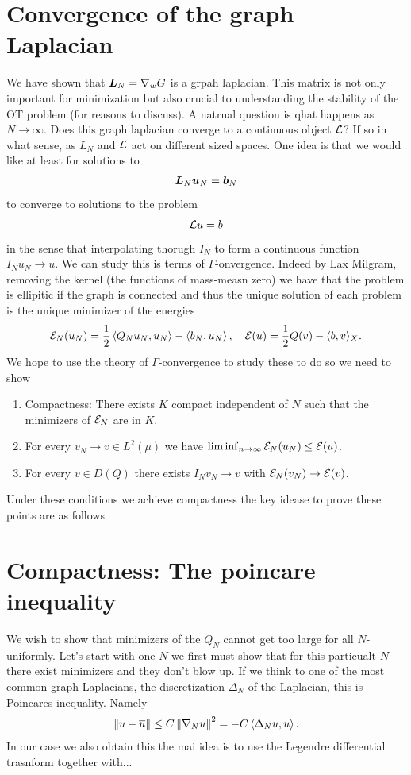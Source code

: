 \documentclass[
    a4paper,
    DIV=13,
    abstract=true,
    numbers=noenddot
]{scrartcl}
\begin{document}
\section{Convergence of the graph Laplacian}
We have shown that ${\bm{L}}_N=\nabla_wG$ is a grpah laplacian. This matrix is not only important for minimization but also crucial to understanding the stability of the OT problem (for reasons to discuss). A natrual question is qhat happens as $N \to \infty$. Does this graph laplacian converge to a continuous object $\mathcal{L}$? If so in what sense, as $L_N$ and $\mathcal{L}$ act on different sized spaces. One idea is that we would like at least for solutions to 
\begin{align*}
    {\bm{L}}_N {\bm{u}}_N= {\bm{b}}_N
\end{align*}
to converge to solutions to the problem
\begin{align*}
    \mathcal{L} u=b
\end{align*}
in the sense that interpolating thorugh $I_N$ to form a continuous function $I_N u_N \to u$. We can study this is terms of $\Gamma$-onvergence. Indeed by Lax Milgram, removing the kernel (the functions of mass-measn zero) we have that the problem is ellipitic if the graph is connected and thus the unique solution of each problem is the unique minimizer of the energies
\begin{align*}
    \mathcal{E}_N(u_N)= \frac{1}{2}\left\langle Q_N u_N,u_N  \right\rangle- \left\langle b_N,u_N \right\rangle, \quad \mathcal{E}(u)=\frac12 Q(v)-\langle b,v\rangle_X.
\end{align*}
We hope to use the theory of $\Gamma$-convergence to study these to do so we need to show 
\begin{enumerate}
  \item Compactness: There exists $K$ compact independent of $N$ such that the minimizers of $\mathcal{E}_N$ are in $K$.
  \item For every $v_N \to v \in L^2(\mu)$ we have $\liminf_{n \to \infty} \mathcal{E}_N(u_N) \le \mathcal{E}(u)$.
  \item For every $v \in D(Q)$ there exists  $I_N v_N \to v$ with $\mathcal{E}_N(v_N) \to \mathcal{E}(v)$.
\end{enumerate}
Under these conditions we achieve compactness the key idease to prove these points are as follows

\section{Compactness: The poincare inequality}
We wish to show that minimizers of the $Q_N$ cannot get too large for all $N$-uniformly. Let's start with one $N$ we first must show that for this particualt $N$ there exist minimizers and they don't blow up. If we think to one of the most common graph Laplacians, the discretization $\Delta_N$ of the Laplacian, this is Poincares inequality. Namely 
\begin{align*}
    \left\lVert u - \overline{u} \right\rVert\le C \left\lVert \nabla_N u \right\rVert^2= -C\left\langle\Delta_N u,u\right\rangle.
\end{align*}
In our case we also obtain this the mai idea is to use the Legendre differential trasnform together with...
\end{document}
